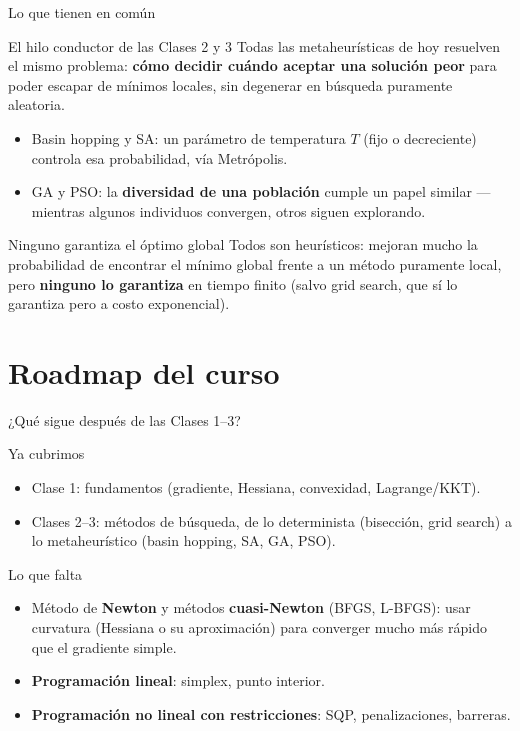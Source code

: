 \documentclass[aspectratio=169,10pt]{beamer}
\begin{document}
\begin{frame}{Lo que tienen en común}
  \begin{block}{El hilo conductor de las Clases 2 y 3}
    Todas las metaheurísticas de hoy resuelven el mismo problema:
    \textbf{cómo decidir cuándo aceptar una solución peor} para poder
    escapar de mínimos locales, sin degenerar en búsqueda puramente
    aleatoria.
    \begin{itemize}
      \item Basin hopping y SA: un parámetro de temperatura $T$
        (fijo o decreciente) controla esa probabilidad, vía Metrópolis.
      \item GA y PSO: la \textbf{diversidad de una población} cumple un
        papel similar — mientras algunos individuos convergen, otros
        siguen explorando.
    \end{itemize}
  \end{block}
  \begin{exampleblock}{Ninguno garantiza el óptimo global}
    Todos son heurísticos: mejoran mucho la probabilidad de encontrar el
    mínimo global frente a un método puramente local, pero
    \textbf{ninguno lo garantiza} en tiempo finito (salvo grid search,
    que sí lo garantiza pero a costo exponencial).
  \end{exampleblock}
\end{frame}

\section{Roadmap del curso}

\begin{frame}{¿Qué sigue después de las Clases 1--3?}
  \begin{block}{Ya cubrimos}
    \begin{itemize}
      \item Clase 1: fundamentos (gradiente, Hessiana, convexidad,
        Lagrange/KKT).
      \item Clases 2--3: métodos de búsqueda, de lo determinista
        (bisección, grid search) a lo metaheurístico (basin hopping,
        SA, GA, PSO).
    \end{itemize}
  \end{block}
  \begin{alertblock}{Lo que falta}
    \begin{itemize}
      \item Método de \textbf{Newton} y métodos \textbf{cuasi-Newton}
        (BFGS, L-BFGS): usar curvatura (Hessiana o su aproximación) para
        converger mucho más rápido que el gradiente simple.
      \item \textbf{Programación lineal}: simplex, punto interior.
      \item \textbf{Programación no lineal con restricciones}: SQP,
        penalizaciones, barreras.
    \end{itemize}
  \end{alertblock}
\end{frame}
\end{document}
